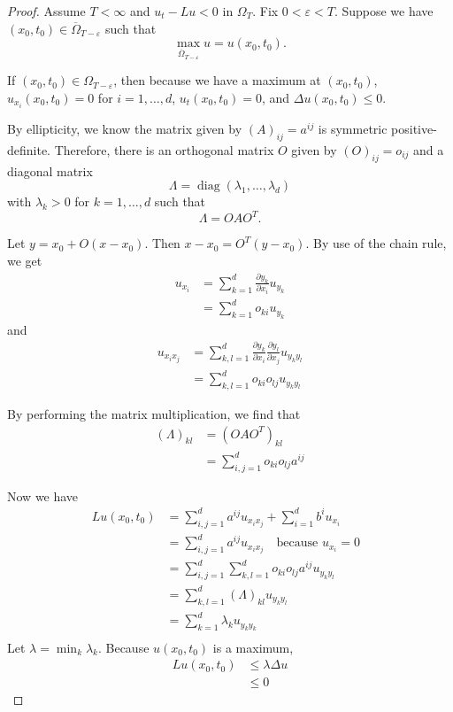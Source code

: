 \documentclass[a4paper]{article}
\begin{document}
\begin{enumerate}
\begin{proof}
      Assume $T < \infty$ and $u_t - Lu < 0$ in $\Omega_T$.
      Fix $0<\varepsilon<T$. Suppose we have $(x_0,t_0) \in \overline{\Omega}_{T-\varepsilon}$ such that
      \[ \max_{\overline{\Omega}_{T-\varepsilon}} u = u(x_0,t_0) .\]

      If $(x_0, t_0) \in \Omega_{T-\varepsilon}$, then because we have a maximum at $(x_0, t_0)$, $u_{x_i}(x_0,t_0) = 0$ for $i = 1, \dots, d$, $u_t(x_0,t_0) = 0$, and $\Delta u(x_0,t_0) \leq 0$.

      By ellipticity, we know the matrix given by $(A)_{ij} = a^{ij}$ is symmetric positive-definite. Therefore, there is an orthogonal matrix $O$
      given by $(O)_{ij} = o_{ij}$ and
      a diagonal matrix
      \[ \Lambda = \mathop{diag} (\lambda_1, \dots, \lambda_d) \]
      with $\lambda_k > 0$ for $k = 1, \dots, d$ such that
      \[ \Lambda = O A O^T .\]

      Let $y = x_0 + O(x - x_0)$. Then $x-x_0 = O^T(y-x_0)$. By use of the chain rule, we get
      \begin{align*}
        u_{x_i} &= \sum_{k=1}^d \frac{\partial y_k}{\partial x_i} u_{y_k} \\
        &= \sum_{k=1}^d o_{ki} u_{y_k}
     \end{align*}
     and
     \begin{align*}
       u_{x_i x_j} &= \sum_{k,l=1}^d \frac{\partial y_k}{\partial x_i} \frac{\partial y_l}{\partial x_j} u_{y_k y_l} \\
       &= \sum_{k,l=1}^d o_{ki} o_{lj} u_{y_k y_l}
     \end{align*}

     By performing the matrix multiplication, we find that
     \begin{align*}
       (\Lambda)_{kl} &= (OAO^T)_{kl} \\
       &= \sum_{i,j=1}^d o_{ki} o_{lj} a^{ij}
     \end{align*}

     Now we have
     \begin{align*}
       Lu(x_0,t_0) &= \sum_{i,j=1}^d a^{ij} u_{x_i x_j} + \sum_{i=1}^d b^i u_{x_i} \\
       &= \sum_{i,j=1}^d a^{ij} u_{x_i x_j} \quad \text{because $u_{x_i}=0$ } \\
       &= \sum_{i,j=1}^d \sum_{k,l=1}^d o_{ki} o_{lj} a^{ij} u_{y_k y_l} \\
       &= \sum_{k,l=1}^d (\Lambda)_{kl} u_{y_k y_l} \\
       &= \sum_{k=1}^d \lambda_k u_{y_k y_k} \\
     \end{align*}
    Let $\lambda = \min_{k} \lambda_k$.
    Because $u(x_0,t_0)$ is a maximum,
    \begin{align*}
      Lu(x_0,t_0) &\leq \lambda \Delta u \\
      &\leq 0
    \end{align*}


\end{proof}
\end{enumerate}
\end{document}
